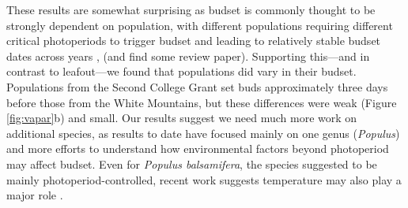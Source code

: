 \documentclass{article}[12pt]
\begin{document}
These results are somewhat surprising as budset is commonly thought to be strongly dependent on population, with different populations requiring different critical photoperiods to trigger budset and leading to relatively stable budset dates across years \citep{soolanayakanahally2013timing}, (and find some review paper). Supporting this---and in contrast to leafout---we found that populations did vary in their budset. Populations from the Second College Grant set buds approximately three days before those from the White Mountains, but these differences were weak (Figure \ref{fig:vapar}b) and small. Our results suggest we need much more work on additional species, as results to date have focused mainly on one genus (\emph{Populus}) and more efforts to understand how environmental factors beyond photoperiod may affect budset. Even for \emph{Populus balsamifera}, the species suggested to be mainly photoperiod-controlled, recent work suggests temperature may also play a major role \citep{Michelson2018}.   
\end{document}
